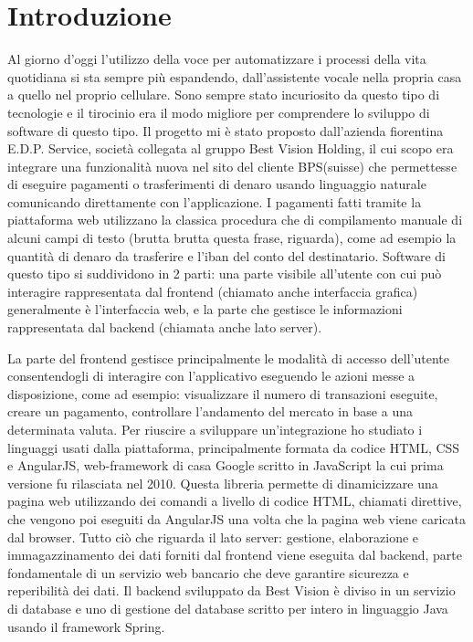 \chapter{Introduzione}
Al giorno d'oggi l'utilizzo della voce per automatizzare i processi della vita quotidiana si sta sempre più espandendo, dall'assistente vocale nella propria casa a quello nel proprio cellulare. Sono sempre stato incuriosito da questo tipo di tecnologie e il tirocinio era il modo migliore per comprendere lo sviluppo di software di questo tipo. Il progetto mi è stato proposto dall'azienda fiorentina E.D.P. Service, società collegata al gruppo Best Vision Holding, il cui scopo era integrare una funzionalità nuova nel sito del cliente BPS(suisse) che permettesse di eseguire pagamenti o trasferimenti di denaro usando linguaggio naturale comunicando direttamente con l'applicazione.
I pagamenti fatti tramite la piattaforma web utilizzano la classica procedura che di compilamento manuale di alcuni campi di testo (brutta brutta questa frase, riguarda), come ad esempio la quantità di denaro da trasferire e l'iban del conto del destinatario.
Software di questo tipo si suddividono in 2 parti: una parte visibile all'utente con cui può interagire rappresentata dal frontend (chiamato anche interfaccia grafica) generalmente è l'interfaccia web, e la parte che gestisce le informazioni rappresentata dal backend (chiamata anche lato server).
\iffalse
https://it.wikipedia.org/wiki/Front-end\_e\_back-end
\fi
La parte del frontend gestisce principalmente le modalità di accesso dell'utente consentendogli di interagire con l'applicativo eseguendo le azioni messe a disposizione, come ad esempio: visualizzare il numero di transazioni eseguite, creare un pagamento, controllare l'andamento del mercato in base a una determinata valuta.
Per riuscire a sviluppare un'integrazione ho studiato i linguaggi usati dalla piattaforma, principalmente formata da codice HTML, CSS e AngularJS, web-framework di casa Google scritto in JavaScript la cui prima versione fu rilasciata nel 2010. Questa libreria permette di dinamicizzare una pagina web utilizzando dei comandi a livello di codice HTML, chiamati direttive, che vengono poi eseguiti da AngularJS una volta che la pagina web viene caricata dal browser.
Tutto ciò che riguarda il lato server: gestione, elaborazione e immagazzinamento dei dati forniti dal frontend viene eseguita dal backend, parte fondamentale di un servizio web bancario che deve garantire sicurezza e reperibilità dei dati. Il backend sviluppato da Best Vision è diviso in un servizio di database e uno di gestione del database scritto per intero in linguaggio Java usando il framework Spring.
